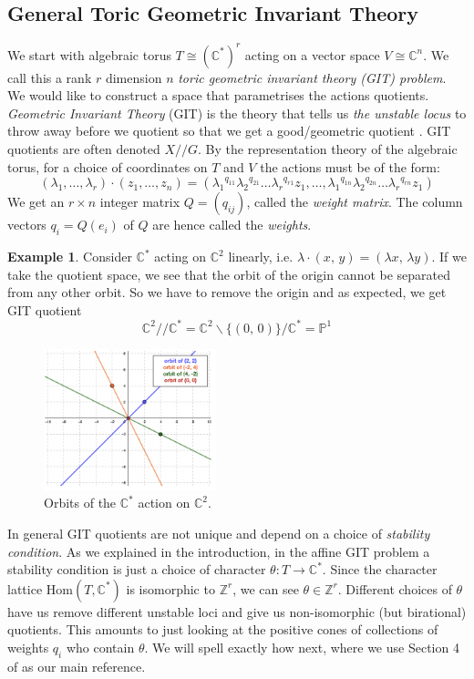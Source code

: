 \documentclass[oneside]{amsart}
\theoremstyle{definition}
\theoremstyle{definition}
\theoremstyle{definition}
\newtheorem{example}{Example} [section]
\theoremstyle{definition}
\newcommand{\CC}{\mathbb{C}}
\newcommand{\Z}{\mathbb{Z}}
\begin{document}
\subsection{General Toric Geometric Invariant Theory}
\label{GIT}
We start with algebraic torus $T \cong (\mathbb{C}^*)^r$ acting on a vector space $V \cong \mathbb{C}^n$. We call this a rank $r$ dimension $n$ \textit{toric geometric invariant theory (GIT) problem}. We would like to construct a space that parametrises the actions quotients. \textit{Geometric Invariant Theory} (GIT) is the theory that tells us \textit{the unstable locus} to throw away before we quotient so that we get a good/geometric quotient \cite{mumford1994geometric}. GIT quotients are often denoted $X // G$. By the representation theory of the algebraic torus, for a choice of coordinates on $T$ and $V$ the actions must be of the form:
$$
(\lambda_1, \dots, \lambda_r) \cdot (z_1, \dots, z_n) = ({\lambda_1}^{q_{11}}{\lambda_2}^{q_{21}}\dots {\lambda_r}^{q_{r1}} z_1, \dots, {\lambda_1}^{q_{1n}}{\lambda_2}^{q_{2n}}\dots {\lambda_r}^{q_{rn}} z_1)
$$
We get an $r \times n$ integer matrix $Q = (q_{ij})$, called the \textit{weight matrix}. The column vectors $q_i = Q(e_i)$ of $Q$ are hence called the \textit{weights}.
\begin{example}
  Consider $\mathbb{C}^*$ acting on $\mathbb{C}^2$ linearly, i.e. $\lambda \cdot (x, \, y) = (\lambda x,\, \lambda y)$.
  If we take the quotient space, we see that the orbit of the origin cannot be separated from any other orbit. So we have to remove the origin and as expected, we get  GIT quotient $$ \mathbb{C}^2 // \mathbb{C}^* = \mathbb{C}^2 \backslash \{(0, \, 0)\} / \mathbb{C}^* = \mathbb{P}^1$$
  \begin{figure}[!h]
    \centering
    \includegraphics[width=5cm]{git/orbits of P1.png}
    \caption{Orbits of the $\mathbb{C}^*$ action on $\mathbb{C}^2$.}
  \end{figure}  
\end{example}
\noindent
In general GIT quotients are not unique and depend on a choice of \textit{stability condition}. As we explained in the introduction, in the affine GIT problem a stability condition is just a choice of character $\theta : T \to \CC^*$. Since the character lattice $\text{Hom}(T, \CC^*)$ is isomorphic to $ \Z^r$, we can see $\theta \in \mathbb{Z}^r$. Different choices of $\theta$ have us remove different unstable loci and give us non-isomorphic (but birational) quotients. This amounts to just looking at the positive cones of collections of weights $q_i$ who contain $\theta$. We will spell exactly how next, where we use Section 4 of \cite{coates2018crepant} as our main reference. \\
\end{document}
